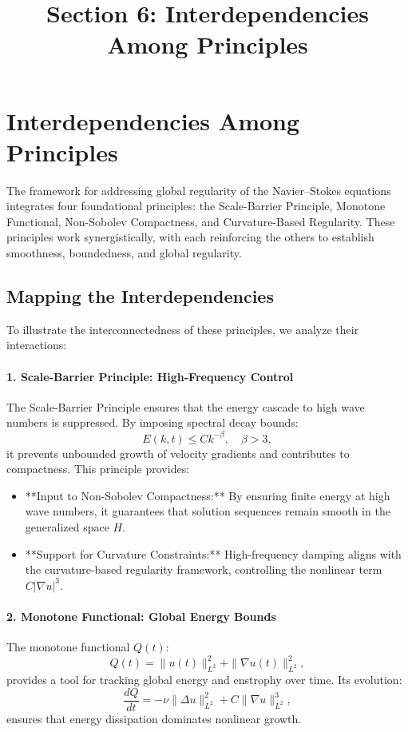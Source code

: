\documentclass[12pt]{article}
\theoremstyle{definition}
\begin{document}
\title{Section 6: Interdependencies Among Principles}
\author{}
\date{}
\maketitle

\section{Interdependencies Among Principles}

The framework for addressing global regularity of the Navier--Stokes equations integrates four foundational principles: the Scale-Barrier Principle, Monotone Functional, Non-Sobolev Compactness, and Curvature-Based Regularity. These principles work synergistically, with each reinforcing the others to establish smoothness, boundedness, and global regularity.

\subsection{Mapping the Interdependencies}
To illustrate the interconnectedness of these principles, we analyze their interactions:

\paragraph{1. Scale-Barrier Principle: High-Frequency Control}
The Scale-Barrier Principle ensures that the energy cascade to high wave numbers is suppressed. By imposing spectral decay bounds:
\begin{equation}
E(k, t) \leq C k^{-\beta}, \quad \beta > 3,
\label{eq:scale_barrier_energy_decay}
\end{equation}
it prevents unbounded growth of velocity gradients and contributes to compactness. This principle provides:
\begin{itemize}
    \item **Input to Non-Sobolev Compactness:** By ensuring finite energy at high wave numbers, it guarantees that solution sequences remain smooth in the generalized space $H$.
    \item **Support for Curvature Constraints:** High-frequency damping aligns with the curvature-based regularity framework, controlling the nonlinear term $C |\nabla u|^3$.
\end{itemize}

\paragraph{2. Monotone Functional: Global Energy Bounds}
The monotone functional $Q(t)$:
\begin{equation}
Q(t) = \|u(t)\|_{L^2}^2 + \|\nabla u(t)\|_{L^2}^2,
\label{eq:monotone_functional}
\end{equation}
provides a tool for tracking global energy and enstrophy over time. Its evolution:
\begin{equation}
\frac{dQ}{dt} = -\nu \|\Delta u\|_{L^2}^2 + C \|\nabla u\|_{L^2}^3,
\end{equation}
ensures that energy dissipation dominates nonlinear growth.
\end{document}

